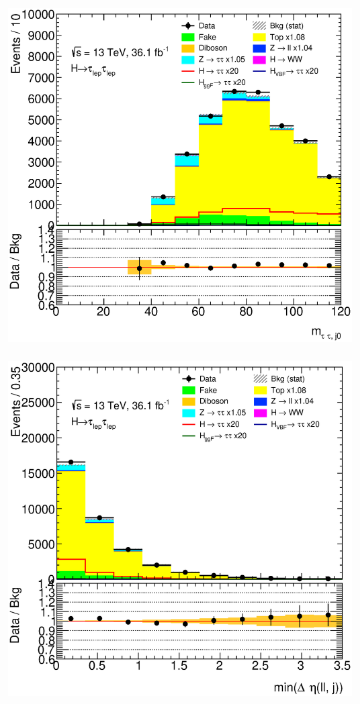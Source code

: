 \begin{figure}[htb]
\begin{subfigure}[t]{0.3\textwidth}
    \end{subfigure}
    \begin{subfigure}[t]{0.3\textwidth}
        \includegraphics[width=\textwidth]{./plots/mva/modeling/input_vars/BOOST_CR/ll-CutMVABoostedCatTopCR-MassTauTauJ0-lin.eps}
    \end{subfigure}
    \begin{subfigure}[t]{0.3\textwidth}
        \includegraphics[width=\textwidth]{./plots/mva/modeling/input_vars/BOOST_CR/ll-CutMVABoostedCatTopCR-MinDEtaDilepJets-lin.eps}

\end{subfigure}
\end{figure}
